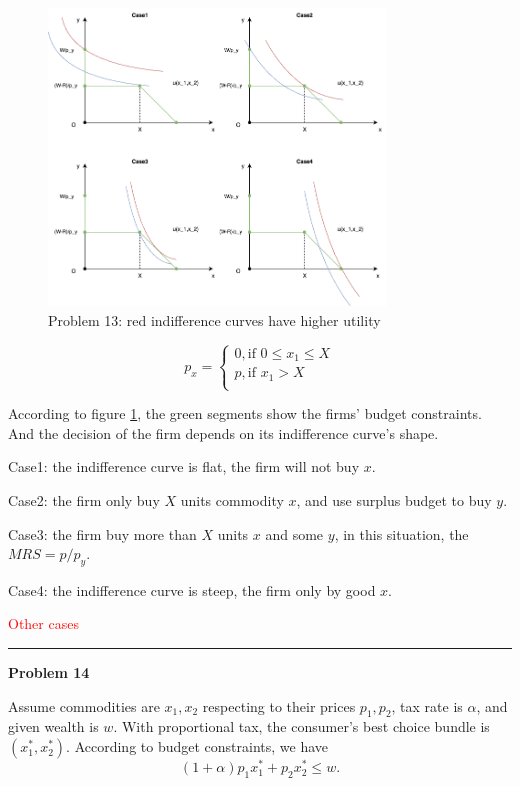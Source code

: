 \documentclass[letterpaper, 11pt]{article}
\newcommand{\1}{\mathds{1}}	%
\theoremstyle{definition}
\begin{document}
\begin{figure}[H] %
    \centering
    \includegraphics[width=0.8\textwidth]{images/micro1_ps1_p13.drawio.png}
    \caption{Problem 13: red indifference curves have higher utility}
    \label{fig:mylabel}
\end{figure}

\[
    p_x = \left\{\begin{array}{l}
        0 , \text{if } 0 \leq  x_1 \leq X \\
        p, \text{if } x_1 > X             \\
    \end{array}\right.
\]

According to figure \ref{fig:mylabel}, the green segments show the firms' budget constraints. And the decision of the firm depends on its indifference curve's shape.

Case1: the indifference curve is flat, the firm will not buy $x$.

Case2: the firm only buy $X$ units commodity $x$, and use surplus budget to buy $y$.

Case3: the firm buy more than $X$ units $x$ and some $y$, in this situation, the $MRS = p/p_y$.

Case4: the indifference curve is steep, the firm only by good $x$.

\textcolor{red}{Other cases}


\bigskip
\hrule
\bigskip

\textbf{Problem 14}


Assume commodities are $x_1, x_2$ respecting to their prices $p_1,p_2$, tax rate is $\alpha$, and given wealth is $w$. With proportional tax, the consumer's best choice bundle is $(x_1^*, x_2^*)$. According to budget constraints, we have \[
    (1+\alpha)p_1x_1^* + p_2x_2^* \leq w.
\]
\end{document}
